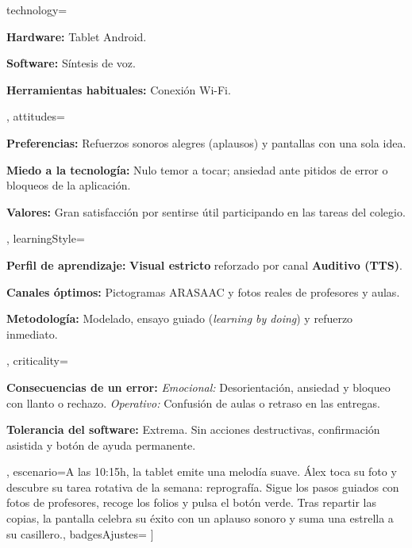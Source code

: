 \documentclass[10pt]{article}
\begin{document}
    technology={%
        \item \textbf{Hardware:} Tablet Android.
        \item \textbf{Software:} Síntesis de voz.
        \item \textbf{Herramientas habituales:} Conexión Wi-Fi.
    },
    attitudes={%
        \item \textbf{Preferencias:} Refuerzos sonoros alegres (aplausos) y pantallas con una sola idea.
        \item \textbf{Miedo a la tecnología:} Nulo temor a tocar; ansiedad ante pitidos de error o bloqueos de la aplicación.
        \item \textbf{Valores:} Gran satisfacción por sentirse útil participando en las tareas del colegio.
    },
    learningStyle={%
        \item \textbf{Perfil de aprendizaje:} \textbf{Visual estricto} reforzado por canal \textbf{Auditivo (TTS)}.
        \item \textbf{Canales óptimos:} Pictogramas ARASAAC y fotos reales de profesores y aulas.
        \item \textbf{Metodología:} Modelado, ensayo guiado (\textit{learning by doing}) y refuerzo inmediato.
    },
    criticality={%
        \item \textbf{Consecuencias de un error:} \textit{Emocional:} Desorientación, ansiedad y bloqueo con llanto o rechazo. \textit{Operativo:} Confusión de aulas o retraso en las entregas.
        \item \textbf{Tolerancia del software:} Extrema. Sin acciones destructivas, confirmación asistida y botón de ayuda permanente.
    },
    escenario={A las 10:15h, la tablet emite una melodía suave. Álex toca su foto y descubre su tarea rotativa de la semana: reprografía. Sigue los pasos guiados con fotos de profesores, recoge los folios y pulsa el botón verde. Tras repartir las copias, la pantalla celebra su éxito con un aplauso sonoro y suma una estrella a su casillero.},
    badgesAjustes={%
         \hspace{2mm}
         \hspace{2mm}
         \hspace{2mm}
    }%
]
\end{document}
